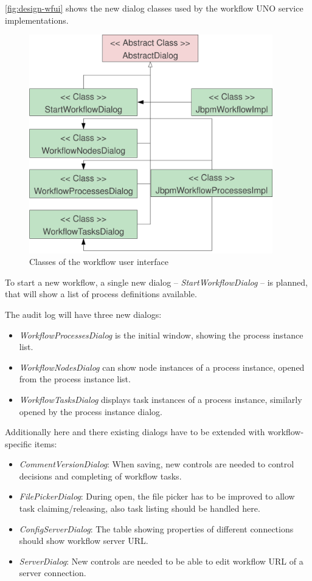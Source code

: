 
\autoref{fig:design-wfui} shows the new dialog classes used by the workflow
UNO service implementations.

\begin{figure}[p]
\centering
\includegraphics[width=400px,keepaspectratio]{design-wfui.pdf}
\caption{Classes of the workflow user interface}
\label{fig:design-wfui}
\end{figure}

To start a new workflow, a single new dialog -- \emph{StartWorkflowDialog} --
is planned, that will show a list of process definitions available.

The audit log will have three new dialogs:

\begin{itemize}
\item \emph{WorkflowProcessesDialog} is the initial window, showing the process instance list.
\item \emph{WorkflowNodesDialog} can show node instances of a process instance, opened from the process instance list.
\item \emph{WorkflowTasksDialog} displays task instances of a process instance, similarly opened by the process instance dialog.
\end{itemize}

Additionally here and there existing dialogs have to be extended with
workflow-specific items:

\begin{itemize}
\item \emph{CommentVersionDialog}: When saving, new controls are needed to control decisions and completing of workflow tasks.
\item \emph{FilePickerDialog}: During open, the file picker has to be improved to allow task claiming/releasing, also task listing should be handled here.
\item \emph{ConfigServerDialog}: The table showing properties of different connections should show workflow server URL.
\item \emph{ServerDialog}: New controls are needed to be able to edit workflow URL of a server connection.
\end{itemize}

